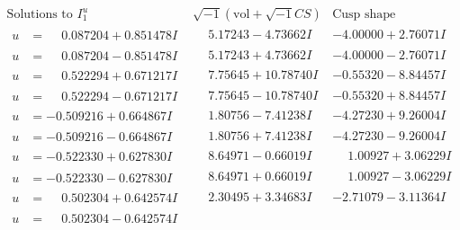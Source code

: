 \documentclass[1p]{elsarticle_modified}
\theoremstyle{definition}
\newcommand{\I}{\sqrt{-1}}
\begin{document}
$$\begin{array}{c|c|c}  
\text{Solutions to }I^u_{1}& \I (\text{vol} + \sqrt{-1}CS) & \text{Cusp shape}\\
 \hline 
\begin{aligned}
u &= \phantom{-}0.087204 + 0.851478 I\end{aligned}
 & \phantom{-}5.17243 - 4.73662 I & -4.00000 + 2.76071 I \\ \hline\begin{aligned}
u &= \phantom{-}0.087204 - 0.851478 I\end{aligned}
 & \phantom{-}5.17243 + 4.73662 I & -4.00000 - 2.76071 I \\ \hline\begin{aligned}
u &= \phantom{-}0.522294 + 0.671217 I\end{aligned}
 & \phantom{-}7.75645 + 10.78740 I & -0.55320 - 8.84457 I \\ \hline\begin{aligned}
u &= \phantom{-}0.522294 - 0.671217 I\end{aligned}
 & \phantom{-}7.75645 - 10.78740 I & -0.55320 + 8.84457 I \\ \hline\begin{aligned}
u &= -0.509216 + 0.664867 I\end{aligned}
 & \phantom{-}1.80756 - 7.41238 I & -4.27230 + 9.26004 I \\ \hline\begin{aligned}
u &= -0.509216 - 0.664867 I\end{aligned}
 & \phantom{-}1.80756 + 7.41238 I & -4.27230 - 9.26004 I \\ \hline\begin{aligned}
u &= -0.522330 + 0.627830 I\end{aligned}
 & \phantom{-}8.64971 - 0.66019 I & \phantom{-}1.00927 + 3.06229 I \\ \hline\begin{aligned}
u &= -0.522330 - 0.627830 I\end{aligned}
 & \phantom{-}8.64971 + 0.66019 I & \phantom{-}1.00927 - 3.06229 I \\ \hline\begin{aligned}
u &= \phantom{-}0.502304 + 0.642574 I\end{aligned}
 & \phantom{-}2.30495 + 3.34683 I & -2.71079 - 3.11364 I \\ \hline\begin{aligned}
u &= \phantom{-}0.502304 - 0.642574 I\end{aligned}

\end{array}$$
\end{document}
